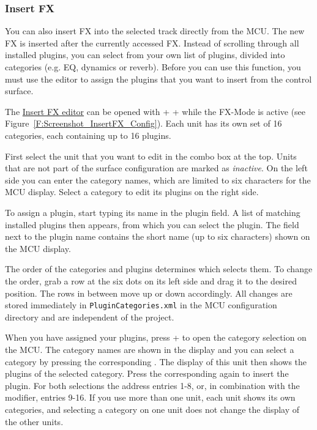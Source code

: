 \subsubsection{Insert FX}\label{pluginsertcategories}
You can also insert FX into the selected track directly from the MCU.
The new FX is inserted after the currently accessed FX. Instead of
scrolling through all installed plugins, you can select from your own
list of plugins, divided into categories (e.g. EQ, dynamics or reverb).
Before you can use this function, you must use the editor to assign the
plugins that you want to insert from the control surface.

The \hyperref[F:Screenshot_InsertFX_Config]{Insert FX editor} can be
opened with \control + \alt +  while the FX-Mode is active (see
Figure~\ref{F:Screenshot_InsertFX_Config}). Each unit has its own set of
16 categories, each containing up to 16 plugins.


First select the unit that you want to edit in the combo box at the top.
Units that are not part of the surface configuration are marked as
\emph{inactive}. On the left side you can enter the category names, which
are limited to six characters for the MCU display. Select a category to
edit its plugins on the right side.

To assign a plugin, start typing its name in the plugin field. A list of
matching installed plugins then appears, from which you can select the
plugin. The field next to the plugin name contains the short name
(up to six characters) shown on the MCU display.

The order of the categories and plugins determines which \vpot selects
them. To change the order, grab a row at the six dots on its left side
and drag it to the desired position. The rows in between move up or down
accordingly. All changes are stored immediately in
\texttt{PluginCategories.xml} in the MCU configuration directory and are
independent of the project.

When you have assigned your plugins, press \control +  to open
the category selection on the MCU. The category names are shown in the
display and you can select a category by pressing the corresponding
\vpot. The display of this unit then shows the plugins of the selected
category. Press the corresponding \vpot again to insert the plugin.
For both selections the \vpots address entries 1-8, or, in combination
with the \shift modifier, entries 9-16. If you use more than one unit,
each unit shows its own categories, and selecting a category on one unit
does not change the display of the other units.

